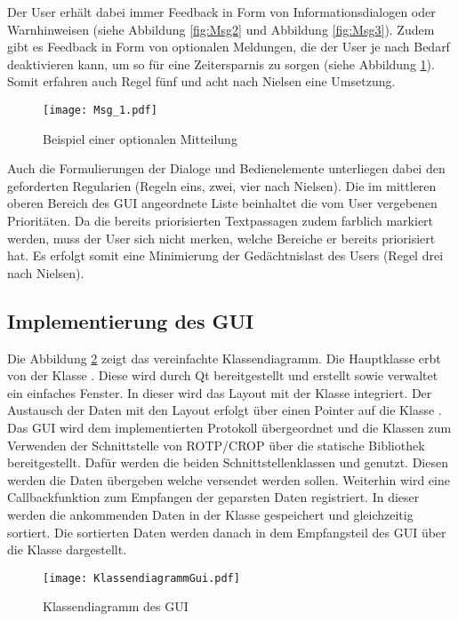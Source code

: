 Der User erh{\"a}lt dabei immer Feedback in Form von
Informationsdialogen oder Warnhinweisen (siehe Abbildung \ref{fig:Msg2} und
Abbildung
\ref{fig:Msg3}). Zudem gibt es Feedback in Form von optionalen Meldungen, die
der User je nach Bedarf deaktivieren kann, um so f{\"u}r eine Zeitersparnis zu
sorgen (siehe Abbildung \ref{fig:Msg1}). Somit erfahren auch Regel f{\"u}nf und
acht nach Nielsen eine Umsetzung.

\begin{figure}[H]
	\centering
	\texttt{[image: Msg\_1.pdf]}
	\caption{Beispiel einer optionalen Mitteilung}
	\label{fig:Msg1}
\end{figure}

Auch die Formulierungen der Dialoge und Bedienelemente unterliegen dabei den
geforderten Regularien (Regeln eins, zwei, vier nach Nielsen). Die im mittleren
oberen Bereich des \gls{GUI} angeordnete Liste beinhaltet die vom User
vergebenen Priorit{\"a}ten. Da die bereits priorisierten Textpassagen zudem farblich
markiert werden, muss der User sich nicht merken, welche Bereiche er bereits
priorisiert hat. Es erfolgt somit eine Minimierung der Ged{\"a}chtnislast des
Users (Regel drei nach Nielsen).

\subsection{Implementierung des GUI}

Die Abbildung \ref{fig:KlassendiagrammGui} zeigt das vereinfachte
Klassendiagramm.
Die Hauptklasse  erbt von der Klasse . Diese
wird durch Qt bereitgestellt und erstellt sowie verwaltet ein einfaches Fenster.
In dieser wird das Layout mit der Klasse  integriert.
Der Austausch der Daten mit den Layout erfolgt über einen Pointer auf die
Klasse . \newline
Das \gls{GUI} wird dem implementierten Protokoll übergeordnet und die Klassen
zum Verwenden der Schnittstelle von \gls{ROTP}/\gls{CROP} über die statische
Bibliothek bereitgestellt. Dafür werden die beiden Schnittstellenklassen
 und  genutzt. Diesen werden die Daten
übergeben welche versendet werden sollen. Weiterhin wird eine Callbackfunktion
zum Empfangen der geparsten Daten registriert. In dieser werden die ankommenden
Daten in der Klasse  gespeichert und gleichzeitig
sortiert. Die sortierten Daten werden danach in dem Empfangsteil des \gls{GUI}
über die Klasse  dargestellt.

\begin{figure}[H]
	\centering
	\texttt{[image: KlassendiagrammGui.pdf]}
	\caption{Klassendiagramm des GUI}
	\label{fig:KlassendiagrammGui}
\end{figure}
